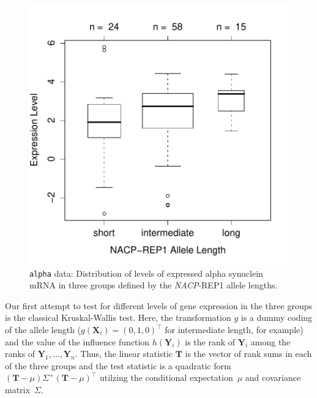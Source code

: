 \documentclass{article}
\newcommand{\Robject}[1]{\texttt{#1}}
\newcommand{\X}{\mathbf{X}}
\newcommand{\Y}{\mathbf{Y}}
\newcommand{\T}{\mathbf{T}}
\begin{document}
\begin{figure}
\begin{center}
\includegraphics{LegoCondInf-alpha-data-figure}
\caption{\Robject{alpha} data: Distribution of levels of expressed alpha synuclein mRNA
         in three groups defined by the \textit{NACP}-REP1 allele lengths.
         \label{alpha-box}}
\end{center}
\end{figure}


Our first attempt to test for different levels of gene expression in the three
groups is the classical Kruskal-Wallis test. Here, the transformation 
$g$ is a dummy coding of the allele length ($g(\X_i) = (0, 1, 0)^\top$ for
intermediate length, for example) and the value of the influence function 
$h(\Y_i)$ is the rank of $\Y_i$ among the ranks of $\Y_1, \dots, \Y_n$.
Thus, the linear statistic $\T$ is the vector of rank sums in each of the 
three groups and the test statistic is a quadratic form 
$(\T - \mu) \Sigma^+ (\T - \mu)^\top$ 
utilzing the conditional expectation~$\mu$ and covariance matrix~$\Sigma$.
\end{document}
